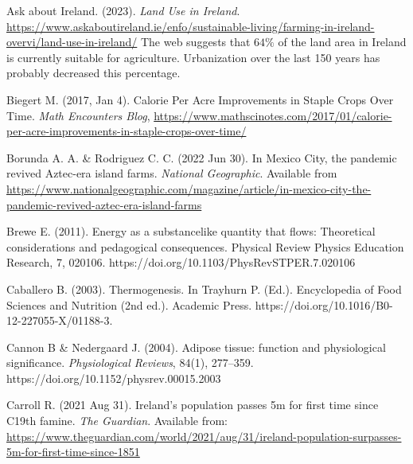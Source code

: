 \documentclass[jou]{apa7}
\begin{document}
\begin{thebibliography}{99}

Ask about Ireland.
(2023).
\textit{Land Use in Ireland}.
\url{https://www.askaboutireland.ie/enfo/sustainable-living/farming-in-ireland-overvi/land-use-in-ireland/}
The web suggests that $64\%$ of the land area in Ireland is currently suitable for agriculture.  Urbanization over the last 150 years has probably decreased this percentage.  


Biegert M.
(2017, Jan 4).
Calorie Per Acre Improvements in Staple Crops Over Time.
\textit{Math Encounters Blog},
\url{https://www.mathscinotes.com/2017/01/calorie-per-acre-improvements-in-staple-crops-over-time/}

Borunda A. A. \& Rodriguez C. C.
(2022 Jun 30).
In Mexico City, the pandemic revived Aztec-era island farms.
\textit{National Geographic}.
Available from \url{https://www.nationalgeographic.com/magazine/article/in-mexico-city-the-pandemic-revived-aztec-era-island-farms}

Brewe E.
(2011).
Energy as a substancelike quantity that flows: Theoretical considerations
and pedagogical consequences.
Physical Review Physics Education Research,
7, 020106.
https://doi.org/10.1103/PhysRevSTPER.7.020106

Caballero B. 
(2003). 
Thermogenesis.
In Trayhurn P. (Ed.). 
Encyclopedia of Food Sciences and Nutrition (2nd ed.).
Academic Press.
https://doi.org/10.1016/B0-12-227055-X/01188-3.

Cannon B \& Nedergaard J. 
(2004).
Adipose tissue: function and physiological significance.
\textit{Physiological Reviews}, 
84(1), 
277--359.
https://doi.org/10.1152/physrev.00015.2003

Carroll R.
(2021 Aug 31).
Ireland’s population passes 5m for first time since C19th famine.
\textit{The Guardian}.
Available from: \url{https://www.theguardian.com/world/2021/aug/31/ireland-population-surpasses-5m-for-first-time-since-1851}



\end{thebibliography}
\end{document}
